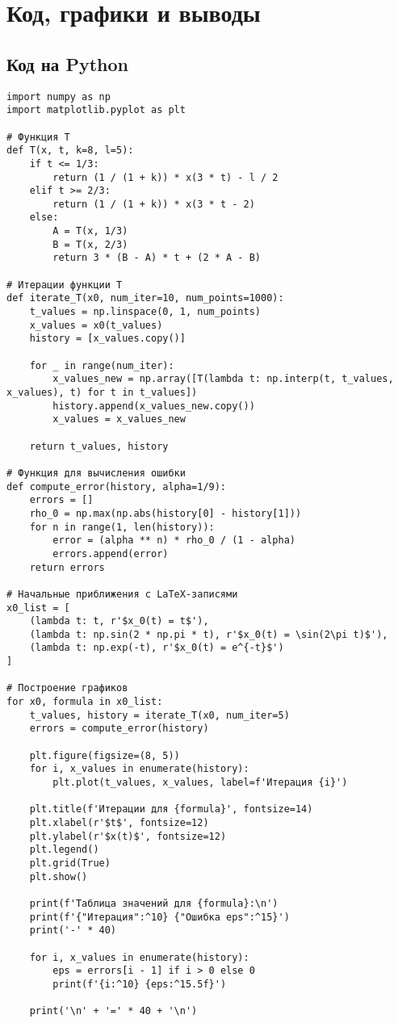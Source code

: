 \documentclass{article}
\begin{document}
\section{Код, графики и выводы}

\subsection{Код на Python}

\begin{lstlisting}
import numpy as np
import matplotlib.pyplot as plt

# Функция T
def T(x, t, k=8, l=5):
    if t <= 1/3:
        return (1 / (1 + k)) * x(3 * t) - l / 2
    elif t >= 2/3:
        return (1 / (1 + k)) * x(3 * t - 2)
    else:
        A = T(x, 1/3)
        B = T(x, 2/3)
        return 3 * (B - A) * t + (2 * A - B)

# Итерации функции T
def iterate_T(x0, num_iter=10, num_points=1000):
    t_values = np.linspace(0, 1, num_points)
    x_values = x0(t_values)
    history = [x_values.copy()]
    
    for _ in range(num_iter):
        x_values_new = np.array([T(lambda t: np.interp(t, t_values, x_values), t) for t in t_values])
        history.append(x_values_new.copy())
        x_values = x_values_new
    
    return t_values, history

# Функция для вычисления ошибки
def compute_error(history, alpha=1/9):
    errors = []
    rho_0 = np.max(np.abs(history[0] - history[1]))
    for n in range(1, len(history)):
        error = (alpha ** n) * rho_0 / (1 - alpha)
        errors.append(error)
    return errors

# Начальные приближения с LaTeX-записями
x0_list = [
    (lambda t: t, r'$x_0(t) = t$'),
    (lambda t: np.sin(2 * np.pi * t), r'$x_0(t) = \sin(2\pi t)$'),
    (lambda t: np.exp(-t), r'$x_0(t) = e^{-t}$')
]

# Построение графиков
for x0, formula in x0_list:
    t_values, history = iterate_T(x0, num_iter=5)
    errors = compute_error(history)
    
    plt.figure(figsize=(8, 5))
    for i, x_values in enumerate(history):
        plt.plot(t_values, x_values, label=f'Итерация {i}')
    
    plt.title(f'Итерации для {formula}', fontsize=14)
    plt.xlabel(r'$t$', fontsize=12)
    plt.ylabel(r'$x(t)$', fontsize=12)
    plt.legend()
    plt.grid(True)
    plt.show()

    print(f'Таблица значений для {formula}:\n')
    print(f'{"Итерация":^10} {"Ошибка eps":^15}')
    print('-' * 40)
    
    for i, x_values in enumerate(history):
        eps = errors[i - 1] if i > 0 else 0  
        print(f'{i:^10} {eps:^15.5f}')
    
    print('\n' + '=' * 40 + '\n')


\end{lstlisting}
\end{document}
